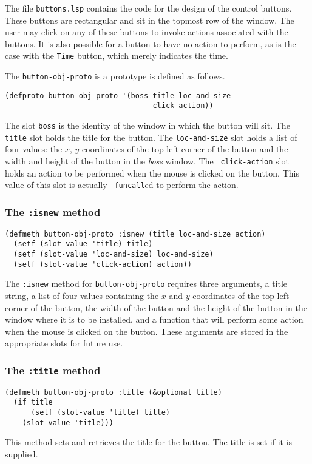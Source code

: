 The file {\tt buttons.lsp} contains the code for the design of the
control buttons.  These buttons are rectangular and sit in the
topmost row of the window.  The user may click on any of these buttons
to invoke actions associated with the buttons.  It
is also possible for a button to have no action to perform, as is the
case with the {\tt Time} button, which merely indicates the time.

The {\tt button-obj-proto} is a prototype is defined as follows.
\begin{verbatim}
(defproto button-obj-proto '(boss title loc-and-size 
                                  click-action)) 
\end{verbatim}
The slot {\tt boss} is the identity of the window in which the button
will sit.  The {\tt title} slot holds the title for the button.  The
{\tt loc-and-size} slot holds a list of four values: the $x$, $y$
coordinates of the top left corner of the button and the width and
height of the button in the {\em boss\/} window. The {\tt
  click-action} slot holds an action to be performed when the mouse
is clicked on the button.  This value of this slot is actually {\tt
  funcall}ed to perform the action. 

\subsubsection{The {\tt :isnew} method}
\label{subsubsec:buttons-isnew}
\begin{verbatim}
(defmeth button-obj-proto :isnew (title loc-and-size action)
  (setf (slot-value 'title) title)
  (setf (slot-value 'loc-and-size) loc-and-size)
  (setf (slot-value 'click-action) action))
\end{verbatim}
The {\tt :isnew} method for {\tt button-obj-proto} requires three
arguments, a title string, a list of four values containing the $x$
and $y$ coordinates of the top left corner of the button, the width of the
button and the height of the button in the window where it is to be
installed, and a function that will perform some action when the mouse
is clicked on the button.  These arguments are stored in the
appropriate slots for future use. 

\subsubsection{The {\tt :title} method}
\label{subsubsec:buttons-title}
\begin{verbatim}
(defmeth button-obj-proto :title (&optional title)
  (if title
      (setf (slot-value 'title) title)
    (slot-value 'title)))
\end{verbatim}
This method sets and retrieves the title for the button. The title is
set if it is supplied.

